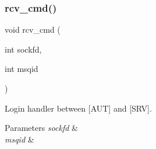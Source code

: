 \subsubsection{rcv\+\_\+cmd()}
{\footnotesize\ttfamily void rcv\+\_\+cmd (\begin{DoxyParamCaption}\item[{int}]{sockfd,  }\item[{int}]{msqid }\end{DoxyParamCaption})}



Login handler between [A\+UT] and [S\+RV]. 


\begin{DoxyParams}{Parameters}
{\em sockfd} & \\
\hline
{\em msqid} & \\
\hline
\end{DoxyParams}
